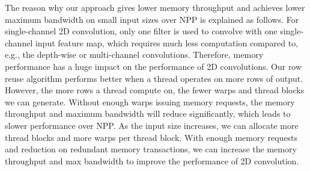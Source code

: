 The reason why our approach gives lower memory throughput and achieves lower maximum bandwidth on small input sizes over NPP is explained
as follows. For single-channel 2D convolution, only one filter is used to convolve with one single-channel input feature map, which
requires much less computation compared to, e.g., the depth-wise or multi-channel convolutions. Therefore, memory performance has a huge
impact on the performance of 2D convolutions. Our row reuse algorithm performs better when a thread operates on more rows of output.
However, the more rows a thread compute on, the fewer warps and thread blocks we can generate. Without enough warps issuing memory
requests, the memory throughput and maximum bandwidth will reduce significantly, which leads to slower performance over NPP. As the input
size increases, we can allocate more thread blocks and more warps per thread block. With enough memory requests and reduction on redundant
memory transactions, we can increase the memory throughput and max bandwidth to improve the performance of 2D convolution.



